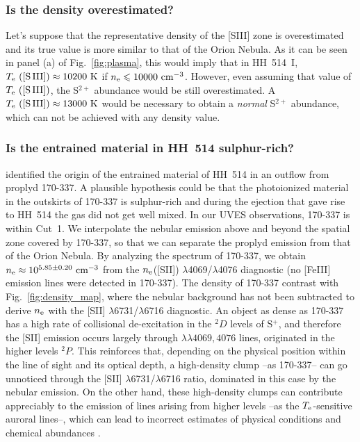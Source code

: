 \documentclass[fleqn,usenatbib]{mnras}
\begin{document}
\subsubsection{Is the density  overestimated?}
\label{subsec:ov_density}

Let's suppose that the representative density of the [S\thinspace III] zone is overestimated and its true value is more similar to that of the Orion Nebula. As it can be seen in panel (a) of Fig.~\ref{fig:plasma}, this would imply that in HH~514~I, $T_{\rm e} \text{ ([S\thinspace III])} \approx 10200 \text{ K}$ if $n_{\rm e} \leq 10000 \text{ cm}^{-3}$. However, even assuming that value of $T_{\rm e} \text{ ([S\thinspace III])}$, the S$^{2+}$ abundance would be still overestimated. A $T_{\rm e} \text{ ([S\thinspace III])} \approx 13000 \text{ K}$ would be necessary to obtain a {\it normal} S$^{2+}$ abundance, which can not be achieved with any density value.

\subsubsection{Is the entrained material in HH~514 sulphur-rich?}
\label{subsec:proplyd}

\citet{bally00} identified the origin of the entrained material of HH~514 in an outflow from proplyd 170-337. A plausible hypothesis could be that the photoionized material in the outskirts of 170-337 is sulphur-rich and during the ejection that gave rise to HH~514 the gas did not get well mixed. In our UVES observations, 170-337 is within Cut~1. We interpolate the nebular emission above and beyond the spatial zone covered by 170-337, so that we can separate the proplyd emission from that of the Orion Nebula. By analyzing the spectrum of 170-337, we obtain  $n_{\rm e}\approx 10^{5.85 \pm 0.20} \text{ cm}^{-3}$ from the $n_{\rm e}$([S\thinspace II]) $\lambda$4069/$\lambda$4076 diagnostic (no [Fe\thinspace III] emission lines were detected in 170-337). The density of 170-337 contrast with Fig.~\ref{fig:density_map}, where the nebular background has not been subtracted to derive $n_{\rm e}$ with the [S\thinspace II] $\lambda$6731/$\lambda$6716 diagnostic. An object as dense as 170-337 has a high rate of collisional de-excitation in the  $^2D$ levels of S$^{+}$, and therefore the [S\thinspace II] emission occurs largely through $\lambda \lambda 4069, 4076$ lines, originated in the higher levels $^2P$. This reinforces that, depending on the physical position within the line of sight and its optical depth, a high-density clump --as 170-337-- can go unnoticed through the [S\thinspace II] $\lambda$6731/$\lambda$6716 ratio, dominated in this case by the nebular emission. On the other hand, these high-density clumps can contribute appreciably to the emission of lines arising from higher levels --as the $T_{\rm e}$-sensitive auroral lines--, which can lead to incorrect estimates of physical conditions and chemical abundances \citep[][]{mendez2021-2}. 
\end{document}
